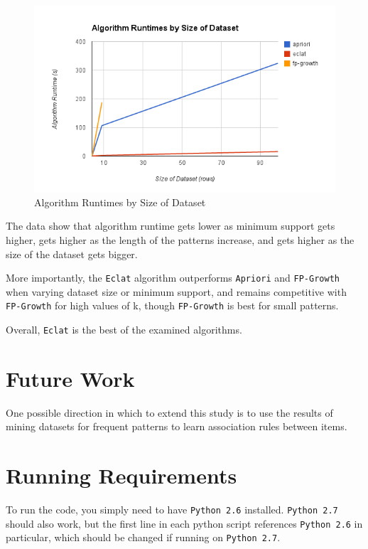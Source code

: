 \documentclass[11pt]{article}
\begin{document}
\begin{multicols}{2}
\begin{center}
\begin{figure}
\includegraphics[scale=0.9]{../figs/runtimes_by_rows.png}
\caption{Algorithm Runtimes by Size of Dataset}
\end{figure}
\end{center}

The data show that algorithm runtime gets lower as minimum support gets
higher, gets higher as the length of the patterns increase, and gets
higher as the size of the dataset gets bigger.

More importantly, the \texttt{Eclat} algorithm outperforms
\texttt{Apriori} and \texttt{FP-Growth} when varying dataset size or
minimum support, and remains competitive with \texttt{FP-Growth} for
high values of k, though \texttt{FP-Growth} is best for small
patterns.

Overall, \texttt{Eclat} is the best of the examined algorithms.

\section{Future Work}

One possible direction in which to extend this study is to use the
results of mining datasets for frequent patterns to learn association
rules between items. \cite{wiki_arl}

\appendix
\section{Running Requirements}

To run the code, you simply need to have \texttt{Python 2.6}
installed.  \texttt{Python 2.7} should also work, but the first line
in each python script references \texttt{Python 2.6} in particular,
which should be changed if running on \texttt{Python 2.7}.


\end{multicols}
\end{document}
